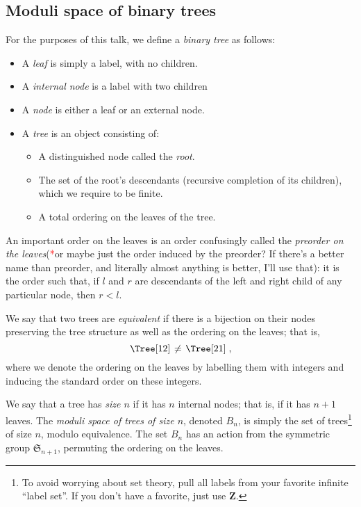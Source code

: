 \documentclass{article}
\newcommand{\ZZ}{\mathbold{Z}}
\newcommand{\tk}{\textcolor{red}{*}}
\newcommand{\Sym}{\mathfrak{S}}
\begin{document}
\subsection{Moduli space of binary trees}
For the purposes of this talk, we define a \textit{binary tree} as follows:
\begin{itemize}
\item A \textit{leaf} is simply a label, with no children.
\item A \textit{internal node} is a label with two children
\item A \textit{node} is either a leaf or an external node.
\item A \textit{tree} is an object consisting of:
  \begin{itemize}
  \item A distinguished node called the \textit{root}.
  \item The set of the root's descendants (recursive completion of its children), which we require to be finite.
  \item A total ordering on the leaves of the tree.
  \end{itemize}

\end{itemize}
An important order on the leaves is an order confusingly called the \textit{preorder on the leaves}(\tk or maybe just the order induced by the preorder?  If there's a better name than preorder, and literally almost anything is better, I'll use that): it is the order such that, if $l$ and $r$ are descendants of the left and right child of any particular node, then $r<l$.

We say that two trees are \textit{equivalent} if there is a bijection on their nodes preserving the tree structure as well as the ordering on the leaves; that is,
\[\left.\Tree[ 1 2 ] \right. \ne \left.\Tree[ 2 1 ] \right. , \]
where we denote the ordering on the leaves by labelling them with integers and inducing the standard order on these integers.

We say that a tree has \textit{size $n$} if it has $n$ internal nodes; that is, if it has $n+1$ leaves.  The \textit{moduli space of trees of size $n$}, denoted $B_n$, is simply the set of trees\footnote{To avoid worrying about set theory, pull all labels from your favorite infinite ``label set''.  If you don't have a favorite, just use $\ZZ$.} of size $n$, modulo equivalence.  The set $B_n$ has an action from the symmetric group $\Sym_{n+1}$, permuting the ordering on the leaves.
\end{document}
